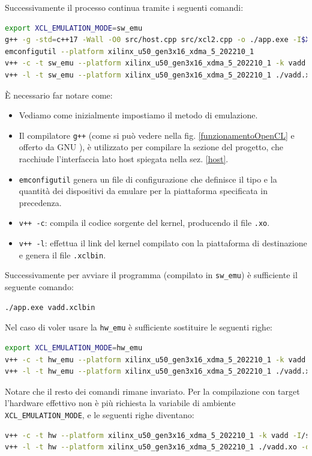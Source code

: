 Successivamente il processo continua tramite i seguenti comandi:
\begin{lstlisting}[language=Bash]
export XCL_EMULATION_MODE=sw_emu
g++ -g -std=c++17 -Wall -O0 src/host.cpp src/xcl2.cpp -o ./app.exe -I$XILINX_XRT/include/ -L$XILINX_XRT/lib -lxrt_coreutil -pthread -lOpenCL
emconfigutil --platform xilinx_u50_gen3x16_xdma_5_202210_1
v++ -c -t sw_emu --platform xilinx_u50_gen3x16_xdma_5_202210_1 -k vadd -I/src src/vadd.cpp -o ./vadd.xo
v++ -l -t sw_emu --platform xilinx_u50_gen3x16_xdma_5_202210_1 ./vadd.xo -o ./vadd.xclbin
\end{lstlisting}
È necessario far notare come:
\begin{itemize}
    \item Vediamo come inizialmente impostiamo il metodo di emulazione.
    \item Il compilatore \texttt{g++} (come si può vedere nella fig. \ref{funzionamentoOpenCL} e offerto da GNU \cite{sitognu}), è utilizzato per compilare la sezione del progetto, che racchiude l'interfaccia lato host spiegata nella sez. \ref{host}.
    \item \texttt{emconfigutil} genera un file di configurazione che definisce il tipo e la quantità dei dispositivi da emulare per la piattaforma specificata in precedenza.
    \item \texttt{v++ -c}: compila il codice sorgente del kernel, producendo il file \texttt{.xo}.
    \item \texttt{v++ -l}: effettua il link del kernel compilato con la piattaforma di destinazione e genera il file \texttt{.xclbin}.
\end{itemize}

Successivamente per avviare il programma (compilato in \texttt{sw\_emu}) è sufficiente il seguente comando: 
\begin{lstlisting}[language=Bash]
./app.exe vadd.xclbin
\end{lstlisting}

Nel caso di voler usare la \texttt{hw\_emu} è sufficiente sostituire le seguenti righe:
\begin{lstlisting}[language=Bash]
export XCL_EMULATION_MODE=hw_emu
v++ -c -t hw_emu --platform xilinx_u50_gen3x16_xdma_5_202210_1 -k vadd -I/src src/vadd.cpp -o ./vadd.xo
v++ -l -t hw_emu --platform xilinx_u50_gen3x16_xdma_5_202210_1 ./vadd.xo -o ./vadd.xclbin
\end{lstlisting}
Notare che il resto dei comandi rimane invariato. Per la compilazione con target l'hardware effettivo non è più richiesta la variabile di ambiente \texttt{XCL\_EMULATION\_MODE}, e le seguenti righe diventano:
\begin{lstlisting}[language=Bash]
v++ -c -t hw --platform xilinx_u50_gen3x16_xdma_5_202210_1 -k vadd -I/src src/vadd.cpp -o ./vadd.xo
v++ -l -t hw --platform xilinx_u50_gen3x16_xdma_5_202210_1 ./vadd.xo -o ./vadd.xclbin
\end{lstlisting}

